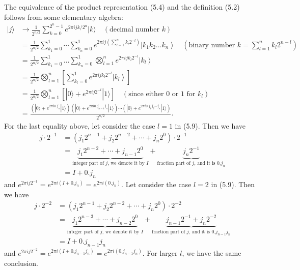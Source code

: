 The equivalence of the product representation (5.4) and the definition (5.2) follows from some elementary algebra:
\begin{align*}
|j\rangle & \rightarrow \frac{1}{2^{n / 2}} \sum_{k=0}^{2^{n}-1} e^{2 \pi i j k / 2^{n}}|k\rangle \quad (\text{decimal number } k) \tag{5.5}\\
& =\frac{1}{2^{n / 2}} \sum_{k_{1}=0}^{1} \cdots \sum_{k_{n}=0}^{1} e^{2 \pi i j\left(\sum_{l=1}^{n} k_{l} 2^{-l}\right)}\left|k_{1} k_{2} \ldots k_{n}\right\rangle  \quad (\text{binary number } k = \sum_{l=1}^n k_l 2^{n-l})\tag{5.6}\\
& =\frac{1}{2^{n / 2}} \sum_{k_{1}=0}^{1} \ldots \sum_{k_{n}=0}^{1} \bigotimes_{l=1}^{n} e^{2 \pi i j k_{l} 2^{-l}}\left|k_{l}\right\rangle  \tag{5.7}\\
& =\frac{1}{2^{n / 2}} \bigotimes_{l=1}^{n}\left[\sum_{k_{l}=0}^{1} e^{2 \pi i j k_{l} 2^{-l}}\left|k_{l}\right\rangle\right]  \tag{5.8}\\
& =\frac{1}{2^{n / 2}} \bigotimes_{l=1}^{n}\left[|0\rangle+e^{2 \pi i j 2^{-l}}|1\rangle\right]  \quad (\text{since either 0 or 1 for } k_{l})  \tag{5.9}\\
& =\frac{\left(|0\rangle+e^{2 \pi i 0. j_{n}}|1\rangle\right)\left(|0\rangle+e^{2 \pi i 0. j_{n-1} j_{n}}|1\rangle\right) \cdots\left(|0\rangle+e^{2 \pi i 0. j_{1} j_{2} \cdots j_{n}}|1\rangle\right)}{2^{n / 2}} . \tag{5.10}
\end{align*} 
For the last equality above, let consider the case $l=1$ in (5.9). Then we have
\begin{align*}
    j \cdot 2^{-1} 
    &=(j_{1} 2^{n-1}+j_{2} 2^{n-2}+\cdots+j_{n} 2^{0})\cdot 2^{-1}\\
    &=\underbrace{j_{1} 2^{n-2}+\cdots+j_{n-1} 2^{0}}_{\text{integer part of $j$, we denote it by $I$}} +\underbrace{j_{n} 2^{-1}}_{\text{fraction part of $j$, and it is $0.j_n$}} \\
    &=I + 0.j_n
\end{align*}
and $e^{2 \pi i  j 2^{-1}}=e^{2 \pi i (I + 0.j_n)}=e^{2 \pi i (0.j_n)}$. Let consider the case $l=2$ in (5.9). Then we have
\begin{align*}
    j \cdot 2^{-2} 
    &=(j_{1} 2^{n-1}+j_{2} 2^{n-2}+\cdots+j_{n} 2^{0})\cdot 2^{-2}\\
    &=\underbrace{j_{1} 2^{n-3}+\cdots+j_{n-2} 2^{0}}_{\text{integer part of $j$, we denote it by $I$}} +\underbrace{j_{n-1} 2^{-1}+ j_{n} 2^{-2}}_{\text{fraction part of $j$, and it is $0.j_{n-1}j_n$}} \\
    &=I + 0.j_{n-1}j_n
\end{align*}
and $e^{2 \pi i  j 2^{-2}}=e^{2 \pi i (I + 0.j_{n-1}j_n)}=e^{2 \pi i (0.j_{n-1}j_n)}$. For larger $l$, we have the same conclusion.

